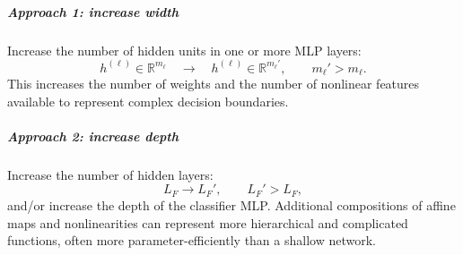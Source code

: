 \documentclass[11pt,a4paper]{article}
\theoremstyle{definition}
\begin{document}
\begin{center}
{%
}
\end{center}

\subparagraph{Approach 1: increase width}

Increase the number of hidden units in one or more MLP layers:
\[
h^{(\ell)}\in\mathbb{R}^{m_\ell}
\quad\longrightarrow\quad
h^{(\ell)}\in\mathbb{R}^{m_\ell'},
\qquad
m_\ell'>m_\ell.
\]
This increases the number of weights and the number of nonlinear features available to represent complex decision boundaries.

\subparagraph{Approach 2: increase depth}

Increase the number of hidden layers:
\[
L_F\to L_F',
\qquad L_F'>L_F,
\]
and/or increase the depth of the classifier MLP. Additional compositions of affine maps and nonlinearities can represent more hierarchical and complicated functions, often more parameter-efficiently than a shallow network.
\end{document}
